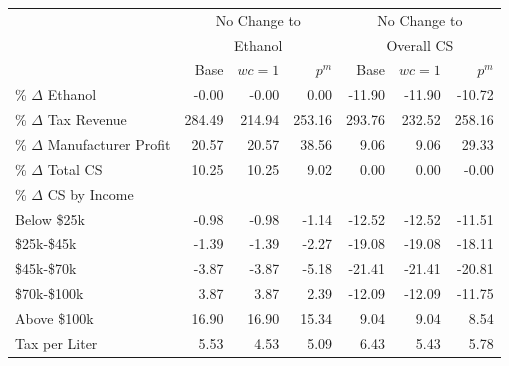 \begin{tabular}{l rrr rrr} 
  
& \multicolumn{3}{c}{No Change to} & \multicolumn{3}{c}{No Change to}   \\ 
& \multicolumn{3}{c}{Ethanol} & \multicolumn{3}{c}{Overall CS} \\ 
& Base & $wc=1$ & $p^m$ & Base & $wc=1$ & $p^m$ \\ \toprule
\% $\Delta$ Ethanol & -0.00 & -0.00 & 0.00 & -11.90 & -11.90 & -10.72 \\
\% $\Delta$ Tax Revenue & 284.49 & 214.94 & 253.16 & 293.76 & 232.52 & 258.16 \\
\% $\Delta$ Manufacturer Profit & 20.57 & 20.57 & 38.56 & 9.06 & 9.06 & 29.33 \\
\% $\Delta$ Total CS & 10.25 & 10.25 & 9.02 & 0.00 & 0.00 & -0.00 \\
\midrule
\% $\Delta$ CS by Income &&& &&\\ 
Below \$25k & -0.98 & -0.98 & -1.14 & -12.52 & -12.52 & -11.51 \\
\$25k-\$45k & -1.39 & -1.39 & -2.27 & -19.08 & -19.08 & -18.11 \\
\$45k-\$70k & -3.87 & -3.87 & -5.18 & -21.41 & -21.41 & -20.81 \\
\$70k-\$100k & 3.87 & 3.87 & 2.39 & -12.09 & -12.09 & -11.75 \\
Above \$100k & 16.90 & 16.90 & 15.34 & 9.04 & 9.04 & 8.54 \\
\midrule
Tax per Liter & 5.53 & 4.53 & 5.09 & 6.43 & 5.43 & 5.78 \\
\bottomrule 
 \end{tabular}